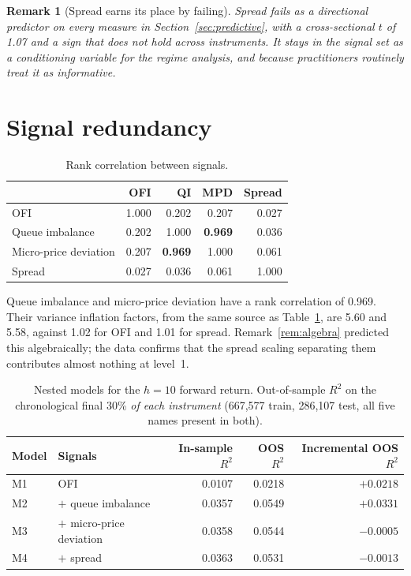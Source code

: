 \documentclass[11pt]{scrartcl}
\newtheorem{remark}{Remark}[section]
\begin{document}
\begin{remark}[Spread earns its place by failing]
Spread fails as a directional predictor on every measure in Section~\ref{sec:predictive}, with a cross-sectional $t$ of 1.07 and a sign that does not hold across instruments. It stays in the signal set as a conditioning variable for the regime analysis, and because practitioners routinely treat it as informative.
\end{remark}

\section{Signal redundancy}
\label{sec:redundancy}

\begin{table}[H]
\centering
\caption{Rank correlation between signals.}
\label{tab:corr}
\begin{tabular}{lrrrr}
\toprule
 & OFI & QI & MPD & Spread \\
\midrule
OFI                   & 1.000 & 0.202 & 0.207 & 0.027 \\
Queue imbalance       & 0.202 & 1.000 & \textbf{0.969} & 0.036 \\
Micro-price deviation & 0.207 & \textbf{0.969} & 1.000 & 0.061 \\
Spread                & 0.027 & 0.036 & 0.061 & 1.000 \\
\bottomrule
\end{tabular}
\end{table}

Queue imbalance and micro-price deviation have a rank correlation of 0.969. Their variance inflation factors, from the same source as Table~\ref{tab:corr}, are 5.60 and 5.58, against 1.02 for OFI and 1.01 for spread. Remark~\ref{rem:algebra} predicted this algebraically; the data confirms that the spread scaling separating them contributes almost nothing at level~1.

\begin{table}[H]
\centering
\caption{Nested models for the $h=10$ forward return. Out-of-sample $R^2$ on the chronological final 30\% \emph{of each instrument} (667{,}577 train, 286{,}107 test, all five names present in both).}
\label{tab:nested}
\begin{tabular}{llrrr}
\toprule
Model & Signals & In-sample $R^2$ & OOS $R^2$ & Incremental OOS $R^2$ \\
\midrule
M1 & OFI                        & 0.0107 & 0.0218 & $+0.0218$ \\
M2 & $+$ queue imbalance        & 0.0357 & 0.0549 & $\mathbf{+0.0331}$ \\
M3 & $+$ micro-price deviation  & 0.0358 & 0.0544 & $\mathbf{-0.0005}$ \\
M4 & $+$ spread                 & 0.0363 & 0.0531 & $-0.0013$ \\
\bottomrule
\end{tabular}
\end{table}
\end{document}
